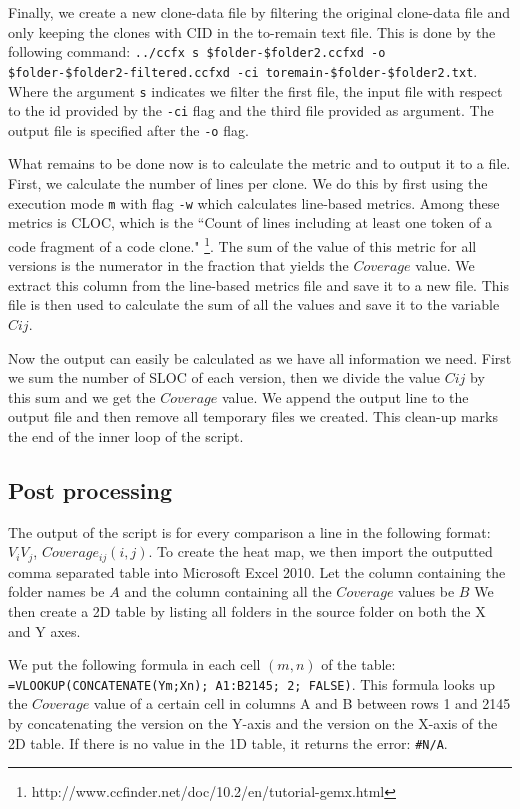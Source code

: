 \documentclass[a4paper,twoside, twocolumn, 11pt]{article}
\numberwithin{equation}{section}
\begin{document}
Finally, we create a new clone-data file by filtering the original clone-data file and only keeping the clones with CID in the to-remain text file.
This is done by the following command: \texttt{../ccfx s \$folder-\$folder2.ccfxd -o \$folder-\$folder2-filtered.ccfxd -ci toremain-\$folder-\$folder2.txt}.
Where the argument \texttt{s} indicates we filter the first file, the input file with respect to the id provided by the \texttt{-ci} flag and the third file provided as argument.
The output file is specified after the \texttt{-o} flag.

What remains to be done now is to calculate the metric and to output it to a file.
First, we calculate the number of lines per clone.
We do this by first using the execution mode \texttt{m} with flag \texttt{-w} which calculates line-based metrics.
Among these metrics is CLOC, which is the ``Count of lines including at least one token of a code fragment of a code clone." \footnote{http://www.ccfinder.net/doc/10.2/en/tutorial-gemx.html}.
The sum of the value of this metric for all versions is the numerator in the fraction that yields the $Coverage$ value.
We extract this column from the line-based metrics file and save it to a new file.
This file is then used to calculate the sum of all the values and save it to the variable $Cij$.

Now the output can easily be calculated as we have all information we need. 
First we sum the number of SLOC of each version, then we divide the value $Cij$ by this sum and we get the $Coverage$ value.
We append the output line to the output file and then remove all temporary files we created.
This clean-up marks the end of the inner loop of the script.

\subsection{Post processing}
The output of the script is for every comparison a line in the following format: $V_iV_j$, $Coverage_{ij}(i,j)$.
To create the heat map, we then import the outputted comma separated table into Microsoft Excel 2010.
Let the column containing the folder names be $A$ and the column containing all the $Coverage$ values be $B$
We then create a 2D table by listing all folders in the source folder on both the X and Y axes.

We put the following formula in each cell $(m,n)$ of the table: 
\texttt{=VLOOKUP(CONCATENATE(Ym;Xn); A1:B2145; 2; FALSE)}.
This formula looks up the $Coverage$ value of a certain cell in columns A and B between rows 1 and 2145 by concatenating the version on the Y-axis and the version on the X-axis of the 2D table.
If there is no value in the 1D table, it returns the error: \texttt{\#N/A}.
\end{document}
